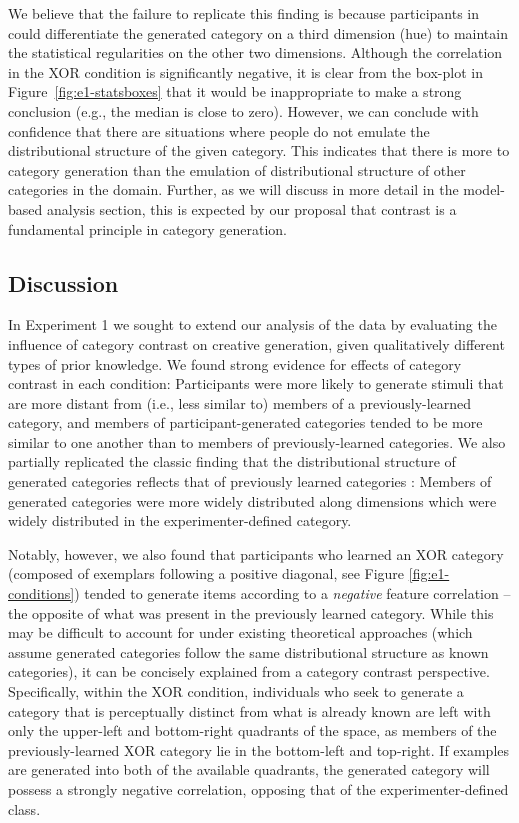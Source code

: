 \documentclass[12pt]{article}
\begin{document}
\begin{flushleft}
We believe that the failure to replicate this finding is because participants in
\cite{jern2013probabilistic} could differentiate the generated category on a
third dimension (hue) to maintain the statistical regularities on the other two
dimensions. Although the correlation in the XOR condition is significantly
negative, it is clear from the box-plot in Figure~\ref{fig:e1-statsboxes} that
it would be inappropriate to make a strong conclusion (e.g., the median is close
to zero). However, we can conclude with confidence that there are situations
where people do not emulate the distributional structure of the given category.
This indicates that there is more to category generation than the emulation of
distributional structure of other categories in the domain. Further, as we will
discuss in more detail in the model-based analysis section, this is expected by
our proposal that contrast is a fundamental principle in category generation.


\subsection{Discussion} In Experiment 1 we sought to extend our analysis of the
\cite{jern2013probabilistic} data by evaluating the influence of category
contrast on creative generation, given qualitatively different types of prior
knowledge. We found strong evidence for effects of category contrast in each
condition: Participants were more likely to generate stimuli that are more
distant from (i.e., less similar to) members of a previously-learned category,
and members of participant-generated categories tended to be more similar to one
another than to members of previously-learned categories. We also partially
replicated the classic finding that the distributional structure of generated
categories reflects that of previously learned categories
\citep{jern2013probabilistic,ward1994structured}: Members of generated
categories were more widely distributed along dimensions which were widely
distributed in the experimenter-defined category.

Notably, however, we also found that participants who learned an XOR category
(composed of exemplars following a positive diagonal, see Figure
\ref{fig:e1-conditions}) tended to generate items according to a {\em negative}
feature correlation -- the opposite of what was present in the previously
learned category. While this may be difficult to account for under existing
theoretical approaches (which assume generated categories follow the same
distributional structure as known categories), it can be concisely explained
from a category contrast perspective. Specifically, within the XOR condition,
individuals who seek to generate a category that is perceptually distinct from
what is already known are left with only the upper-left and bottom-right
quadrants of the space, as members of the previously-learned XOR category lie in
the bottom-left and top-right. If examples are generated into both of the
available quadrants, the generated category will possess a strongly negative
correlation, opposing that of the experimenter-defined class.


\end{flushleft}
\end{document}
